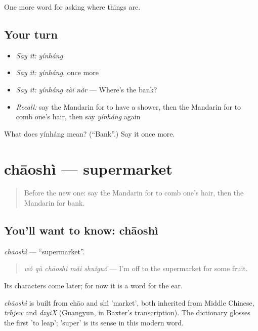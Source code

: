 \begin{grammarlens}[title={What you've built}]
One more word for asking where things are.
\end{grammarlens}

\subsection*{Your turn}
\begin{itemize}
\raggedright
  \item \emph{Say it:} \emph{yínháng}
  \item \emph{Say it:} \emph{yínháng}, once more
  \item \emph{Say it:} \emph{yínháng zài nǎr} — Where's the bank?
  \item \emph{Recall:} say the Mandarin for to have a shower, then the Mandarin for to comb one's hair, then say \emph{yínháng} again
\end{itemize}

\begin{tcolorbox}[breakable,colback=teal!4,colframe=teal!35!black,title={Before you move on}]
What does yínháng mean? (\textquotedblleft{}Bank\textquotedblright{}.) Say it once more.
\end{tcolorbox}
\section[chāoshì]{chāoshì — supermarket}

\label{lesson:ZH-C100-chaoshi}



\begin{quote}
Before the new one: say the Mandarin for to comb one's hair, then the Mandarin for bank.
\end{quote}

\subsection*{You'll want to know: chāoshì}
\emph{chāoshì} — \textquotedblleft{}supermarket\textquotedblright{}.

\begin{quote}
\emph{wǒ qù chāoshì mǎi shuǐguǒ} — I'm off to the supermarket for some fruit.
\end{quote}

Its characters come later; for now it is a word for the ear.

\begin{cousinweb}
\emph{chāoshì} is built from chāo and shì 'market', both inherited from Middle Chinese, \emph{trhjew} and \emph{dzyiX} (Guangyun, in Baxter's transcription). The dictionary glosses the first 'to leap'; 'super' is its sense in this modern word.
\end{cousinweb}

